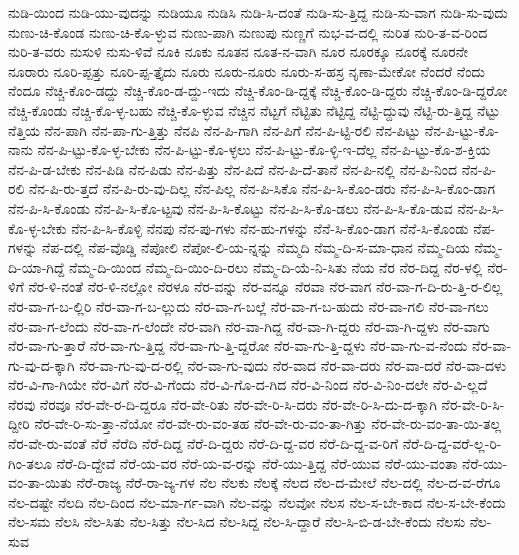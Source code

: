 {ನುಡಿ-ಯಿಂದ
ನುಡಿ-ಯು-ವುದನ್ನು
ನುಡಿಯೂ
ನುಡಿಸಿ
ನುಡಿ-ಸಿ-ದಂತೆ
ನುಡಿ-ಸು-ತ್ತಿದ್ದ
ನುಡಿ-ಸು-ವಾಗ
ನುಡಿ-ಸು-ವುದು
ನುಣು-ಚಿ-ಕೊಂಡ
ನುಣು-ಚಿ-ಕೊ-ಳ್ಳುವ
ನುಣು-ಪಾಗಿ
ನುಣುಪು
ನುಣ್ಣಗೆ
ನುಭ-ವ-ದಲ್ಲಿ
ನುರಿತ
ನುರಿ-ತ-ವ-ರಿಂದ
ನುರಿ-ತ-ವರು
ನುಸುಳಿ
ನುಸು-ಳಿವೆ
ನೂಕಿ
ನೂಕು
ನೂತನ
ನೂತ-ನ-ವಾಗಿ
ನೂರ
ನೂರಕ್ಕೂ
ನೂರಕ್ಕೆ
ನೂರನೇ
ನೂರಾರು
ನೂರಿ-ಪ್ಪತ್ತು
ನೂರಿ-ಪ್ಪ-ತ್ತೈದು
ನೂರು
ನೂರು-ನೂರು
ನೂರು-ಸ-ಹಸ್ರ
ನೃಣಾ-ಮೇಕೋ
ನೆಂದರೆ
ನೆಂದು
ನೆಂದೂ
ನೆಚ್ಚಿ-ಕೊಂ-ಡದ್ದು
ನೆಚ್ಚಿ-ಕೊಂ-ಡ-ದ್ದು-ಇದು
ನೆಚ್ಚಿ-ಕೊಂ-ಡಿ-ದ್ದಕ್ಕೆ
ನೆಚ್ಚಿ-ಕೊಂ-ಡಿ-ದ್ದರು
ನೆಚ್ಚಿ-ಕೊಂ-ಡಿ-ದ್ದರೋ
ನೆಚ್ಚಿ-ಕೊಂಡು
ನೆಚ್ಚಿ-ಕೊ-ಳ್ಳ-ಬಹು
ನೆಚ್ಚಿ-ಕೊ-ಳ್ಳುವ
ನೆಚ್ಚಿನ
ನೆಟ್ಟಗೆ
ನೆಟ್ಟಿತು
ನೆಟ್ಟಿದ್ದ
ನೆಟ್ಟಿ-ದ್ದುವು
ನೆಟ್ಟಿ-ರು-ತ್ತಿದ್ದ
ನೆಟ್ಟು
ನೆತ್ತಿಯ
ನೆನ-ಪಾಗಿ
ನೆನ-ಪಾ-ಗು-ತ್ತಿತ್ತು
ನೆನಪಿ
ನೆನ-ಪಿ-ಗಾಗಿ
ನೆನ-ಪಿಗೆ
ನೆನ-ಪಿ-ಟ್ಟಿ-ರಲಿ
ನೆನ-ಪಿಟ್ಟು
ನೆನ-ಪಿ-ಟ್ಟು-ಕೊ-ನಾನು
ನೆನ-ಪಿ-ಟ್ಟು-ಕೊ-ಳ್ಳ-ಬೇಕು
ನೆನ-ಪಿ-ಟ್ಟು-ಕೊ-ಳ್ಳಲು
ನೆನ-ಪಿ-ಟ್ಟು-ಕೊ-ಳ್ಳಿ-ಇ-ದೆಲ್ಲ
ನೆನ-ಪಿ-ಟ್ಟು-ಕೊ-ಶ-ಕ್ತಿಯ
ನೆನ-ಪಿ-ಡ-ಬೇಕು
ನೆನ-ಪಿಡಿ
ನೆನ-ಪಿಡು
ನೆನ-ಪಿತ್ತು
ನೆನ-ಪಿದೆ
ನೆನ-ಪಿ-ದೆ-ತಾನೆ
ನೆನ-ಪಿ-ನಲ್ಲಿ
ನೆನ-ಪಿ-ನಿಂದ
ನೆನ-ಪಿ-ರಲಿ
ನೆನ-ಪಿ-ರು-ತ್ತದೆ
ನೆನ-ಪಿ-ರು-ವು-ದಿಲ್ಲ
ನೆನ-ಪಿಲ್ಲ
ನೆನ-ಪಿ-ಸಿಕೊ
ನೆನ-ಪಿ-ಸಿ-ಕೊಂ-ಡರು
ನೆನ-ಪಿ-ಸಿ-ಕೊಂ-ಡಾಗ
ನೆನ-ಪಿ-ಸಿ-ಕೊಂಡು
ನೆನ-ಪಿ-ಸಿ-ಕೊ-ಟ್ಟವು
ನೆನ-ಪಿ-ಸಿ-ಕೊಟ್ಟು
ನೆನ-ಪಿ-ಸಿ-ಕೊ-ಡಲು
ನೆನ-ಪಿ-ಸಿ-ಕೊ-ಡುವ
ನೆನ-ಪಿ-ಸಿ-ಕೊ-ಳ್ಳ-ಬೇಕು
ನೆನ-ಪಿ-ಸಿ-ಕೊಳ್ಳಿ
ನೆನಪು
ನೆನ-ಪು-ಗಳು
ನೆನ-ಹು-ಗಳನ್ನು
ನೆನೆ-ಸಿ-ಕೊಂ-ಡಾಗ
ನೆನೆ-ಸಿ-ಕೊಂಡು
ನೆಪ-ಗಳನ್ನು
ನೆಪ-ದಲ್ಲಿ
ನೆಪ-ವೊಡ್ಡಿ
ನೆಪೋಲಿ
ನೆಪೋ-ಲಿ-ಯ-ನ್ನನ್ನು
ನೆಮ್ಮದಿ
ನೆಮ್ಮ-ದಿ-ಸ-ಮಾ-ಧಾನ
ನೆಮ್ಮ-ದಿಯ
ನೆಮ್ಮ-ದಿ-ಯಾ-ಗಿದ್ದೆ
ನೆಮ್ಮ-ದಿ-ಯಿಂದ
ನೆಮ್ಮ-ದಿ-ಯಿಂ-ದಿ-ರಲು
ನೆಮ್ಮ-ದಿ-ಯೆ-ನಿ-ಸಿತು
ನೆಯ
ನೆರ
ನೆರ-ದಿದ್ದ
ನೆರ-ಳಲ್ಲಿ
ನೆರ-ಳಿಗೆ
ನೆರ-ಳಿ-ನಂತೆ
ನೆರ-ಳಿ-ನಲ್ಲೋ
ನೆರಳೂ
ನೆರ-ವನ್ನು
ನೆರ-ವನ್ನೂ
ನೆರವಾ
ನೆರ-ವಾಗ
ನೆರ-ವಾ-ಗ-ದಿ-ರು-ತ್ತಿ-ರ-ಲಿಲ್ಲ
ನೆರ-ವಾ-ಗ-ಬ-ಲ್ಲಿರಿ
ನೆರ-ವಾ-ಗ-ಬ-ಲ್ಲುದು
ನೆರ-ವಾ-ಗ-ಬಲ್ಲೆ
ನೆರ-ವಾ-ಗ-ಬ-ಹುದು
ನೆರ-ವಾ-ಗಲಿ
ನೆರ-ವಾ-ಗಲು
ನೆರ-ವಾ-ಗ-ಲೆಂದು
ನೆರ-ವಾ-ಗ-ಲೆಂದೇ
ನೆರ-ವಾಗಿ
ನೆರ-ವಾ-ಗಿದ್ದ
ನೆರ-ವಾ-ಗಿ-ದ್ದರು
ನೆರ-ವಾ-ಗಿ-ದ್ದಳು
ನೆರ-ವಾಗು
ನೆರ-ವಾ-ಗು-ತ್ತಾರೆ
ನೆರ-ವಾ-ಗು-ತ್ತಿದ್ದ
ನೆರ-ವಾ-ಗು-ತ್ತಿ-ದ್ದರೋ
ನೆರ-ವಾ-ಗು-ತ್ತಿ-ದ್ದಳು
ನೆರ-ವಾ-ಗು-ವ-ನೆಂದು
ನೆರ-ವಾ-ಗು-ವು-ದ-ಕ್ಕಾಗಿ
ನೆರ-ವಾ-ಗು-ವು-ದ-ರಲ್ಲಿ
ನೆರ-ವಾ-ಗು-ವುದು
ನೆರ-ವಾದ
ನೆರ-ವಾ-ದರು
ನೆರ-ವಾ-ದರೆ
ನೆರ-ವಾ-ದಳು
ನೆರ-ವಿ-ಗಾ-ಗಿಯೇ
ನೆರ-ವಿಗೆ
ನೆರ-ವಿ-ಗೆಂದು
ನೆರ-ವಿ-ಗೊ-ದ-ಗಿದ
ನೆರ-ವಿ-ನಿಂದ
ನೆರ-ವಿ-ನಿಂ-ದಲೇ
ನೆರ-ವಿ-ಲ್ಲದೆ
ನೆರವು
ನೆರವೂ
ನೆರ-ವೇ-ರ-ದಿ-ದ್ದರೂ
ನೆರ-ವೇ-ರಿತು
ನೆರ-ವೇ-ರಿ-ಸಿ-ದರು
ನೆರ-ವೇ-ರಿ-ಸಿ-ದು-ದ-ಕ್ಕಾಗಿ
ನೆರ-ವೇ-ರಿ-ಸಿ-ದ್ದೀರಿ
ನೆರ-ವೇ-ರಿ-ಸು-ತ್ತಾ-ನೆಯೋ
ನೆರ-ವೇ-ರು-ವಂ-ತಹ
ನೆರ-ವೇ-ರು-ವಂ-ತಾ-ಗಿತ್ತು
ನೆರ-ವೇ-ರು-ವಂ-ತಾ-ಯಿ-ತಲ್ಲ
ನೆರ-ವೇ-ರು-ವಂತೆ
ನೆರೆ
ನೆರೆದಿ
ನೆರೆ-ದಿದ್ದ
ನೆರೆ-ದಿ-ದ್ದರು
ನೆರೆ-ದಿ-ದ್ದ-ವರ
ನೆರೆ-ದಿ-ದ್ದ-ವ-ರಿಗೆ
ನೆರೆ-ದಿ-ದ್ದ-ವರೆ-ಲ್ಲ-ರಿ-ಗಿಂ-ತಲೂ
ನೆರೆ-ದಿ-ದ್ದೇವೆ
ನೆರೆ-ಯ-ವರ
ನೆರೆ-ಯ-ವ-ರನ್ನು
ನೆರೆ-ಯು-ತ್ತಿದ್ದ
ನೆರೆ-ಯುವ
ನೆರೆ-ಯು-ವಂತಾ
ನೆರೆ-ಯು-ವಂ-ತಾ-ಯಿತು
ನೆರೆ-ರಾಜ್ಯ
ನೆರೆ-ರಾ-ಜ್ಯ-ಗಳ
ನೆಲ
ನೆಲಕು
ನೆಲಕ್ಕೆ
ನೆಲದ
ನೆಲ-ದ-ಮೇಲೆ
ನೆಲ-ದಲ್ಲಿ
ನೆಲ-ದ-ವ-ರೆಗೂ
ನೆಲ-ದಷ್ಟೇ
ನೆಲದಿ
ನೆಲ-ದಿಂದ
ನೆಲ-ಮಾ-ರ್ಗ-ವಾಗಿ
ನೆಲ-ವನ್ನು
ನೆಲವೋ
ನೆಲಸ
ನೆಲ-ಸ-ಬೇ-ಕಾದ
ನೆಲ-ಸ-ಬೇ-ಕೆಂದು
ನೆಲ-ಸಮ
ನೆಲಸಿ
ನೆಲ-ಸಿತು
ನೆಲ-ಸಿತ್ತು
ನೆಲ-ಸಿದ
ನೆಲ-ಸಿದ್ದ
ನೆಲ-ಸಿ-ದ್ದಾರೆ
ನೆಲ-ಸಿ-ಬಿ-ಡ-ಬೇ-ಕೆಂದು
ನೆಲಸು
ನೆಲ-ಸುವ
}
